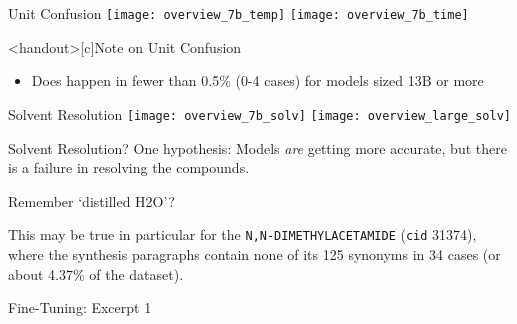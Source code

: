 \begin{frame}{Unit Confusion}
    \pause
    \texttt{[image: overview\_7b\_temp]}
    \texttt{[image: overview\_7b\_time]}
\end{frame}

\begin{frame}<handout>[c]{Note on Unit Confusion}
    \Large 
    \begin{itemize}
        \item Does happen in fewer than 0.5\% (0-4 cases) for models sized 13B or more
    \end{itemize}
\end{frame}

\begin{frame}{Solvent Resolution}
    \centering
    \texttt{[image: overview\_7b\_solv]}
    \texttt{[image: overview\_large\_solv]}
\end{frame}


\begin{frame}[c]{Solvent Resolution?}
    \large
    One hypothesis: Models \textit{are} getting more accurate, but there is a failure in resolving the compounds.

    \vspace{2em}
    \pause

    Remember `distilled H2O'?

    \vspace{2em}
    \pause

    This may be true in particular for the \tsolv \texttt{N,N-DIMETHYLACETAMIDE} (\texttt{cid} 31374), where the synthesis paragraphs contain none of its 125 synonyms in 34 cases (or about 4.37\% of the dataset). 
\end{frame}

\begin{frame}[c]{Fine-Tuning: Excerpt 1}
\end{frame}


